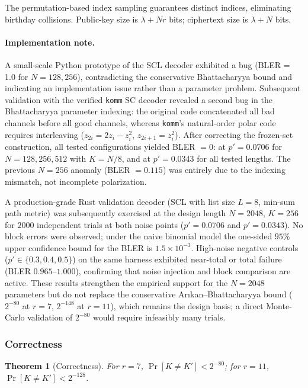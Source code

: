 \documentclass[11pt,a4paper]{article}
\theoremstyle{plain}
\newtheorem{theorem}{Theorem}[section]
\theoremstyle{definition}
\begin{document}
The permutation-based index sampling guarantees distinct indices, eliminating birthday collisions. Public-key size is $\lambda + N r$ bits; ciphertext size is $\lambda + N$ bits.

\paragraph{Implementation note.} A small-scale Python prototype of the SCL decoder exhibited a bug (BLER = 1.0 for $N=128,256$), contradicting the conservative Bhattacharyya bound and indicating an implementation issue rather than a parameter problem. Subsequent validation with the verified \texttt{komm} SC decoder \cite{komm} revealed a second bug in the Bhattacharyya parameter indexing: the original code concatenated all bad channels before all good channels, whereas \texttt{komm}'s natural-order polar code requires interleaving ($z_{2i}=2z_i-z_i^2$, $z_{2i+1}=z_i^2$). After correcting the frozen-set construction, all tested configurations yielded BLER $=0$: at $p'=0.0706$ for $N=128,256,512$ with $K=N/8$, and at $p'=0.0343$ for all tested lengths. The previous $N=256$ anomaly (BLER $=0.115$) was entirely due to the indexing mismatch, not incomplete polarization.

A production-grade Rust validation decoder (SCL with list size $L=8$, min-sum path metric) was subsequently exercised at the design length $N=2048$, $K=256$ for $2000$ independent trials at both noise points ($p'=0.0706$ and $p'=0.0343$). No block errors were observed; under the naive binomial model the one-sided $95\%$ upper confidence bound for the BLER is $1.5\times10^{-3}$. High-noise negative controls ($p'\in\{0.3,0.4,0.5\}$) on the same harness exhibited near-total or total failure (BLER $0.965$--$1.000$), confirming that noise injection and block comparison are active. These results strengthen the empirical support for the $N=2048$ parameters but do not replace the conservative Ar\i{}kan--Bhattacharyya bound ($2^{-80}$ at $r=7$, $2^{-148}$ at $r=11$), which remains the design basis; a direct Monte-Carlo validation of $2^{-80}$ would require infeasibly many trials.

\subsubsection{Correctness}
\label{subsubsec:kem-correctness}

\begin{theorem}[Correctness]
\label{thm:kem-correctness}
For $r=7$, $\Pr[K \neq K'] < 2^{-80}$; for $r=11$, $\Pr[K \neq K'] < 2^{-128}$.
\end{theorem}
\end{document}
